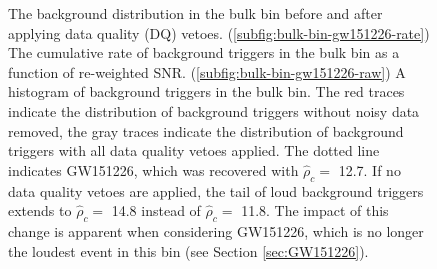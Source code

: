 \begin{figure}[!ht]%
\centering
  \caption[Bulk bin histograms - GW150914 analysis]{The background distribution in the bulk bin before and after applying data quality %
           (DQ) vetoes. %
           (\ref{subfig:bulk-bin-gw151226-rate}) The cumulative rate of background triggers %
           in the bulk bin as a function of re-weighted SNR. %
           (\ref{subfig:bulk-bin-gw151226-raw}) A histogram of background triggers %
           in the bulk bin. %
           The red traces indicate the %
           distribution of background triggers without noisy data removed, %
           the gray traces indicate the distribution %
           of background triggers with all data quality vetoes applied. %
           The dotted line indicates GW151226, which was recovered with $\hat{\rho}_{c} =$ 12.7. %
           If no data quality vetoes are applied, the tail of loud background triggers extends to %
           $\hat{\rho}_{c} =$ 14.8 instead of $\hat{\rho}_{c} =$ 11.8. %
           The impact of this change is apparent when considering GW151226, which is no %
           longer the loudest event in this bin (see Section \ref{sec:GW151226}). %
          }
\label{fig:bulk-bin-far-GW151226}
\end{figure}

